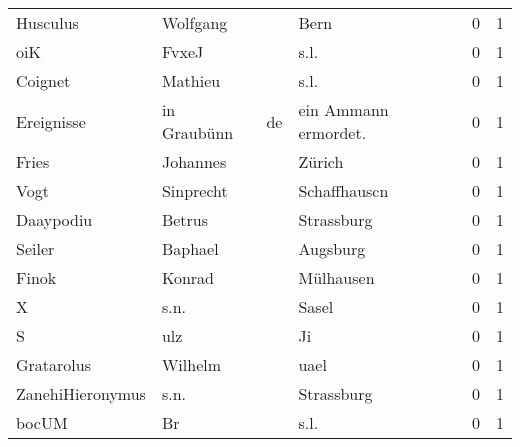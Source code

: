 \begin{tabular}{llllrr}
                 Husculus &                           Wolfgang &             &                                        Bern &          0 &         1 \\
                      oiK &                              FvxeJ &             &                                        s.l. &          0 &         1 \\
                  Coignet &                            Mathieu &             &                                        s.l. &          0 &         1 \\
               Ereignisse &                        in Graubünn &          de &                       ein Ammann ermordet.  &          0 &         1 \\
                    Fries &                           Johannes &             &                                      Zürich &          0 &         1 \\
                     Vogt &                          Sinprecht &             &                                Schaffhauscn &          0 &         1 \\
                Daaypodiu &                             Betrus &             &                                  Strassburg &          0 &         1 \\
                   Seiler &                            Baphael &             &                                    Augsburg &          0 &         1 \\
                    Finok &                             Konrad &             &                                   Mülhausen &          0 &         1 \\
                        X &                               s.n. &             &                                       Sasel &          0 &         1 \\
                        S &                                ulz &             &                                          Ji &          0 &         1 \\
               Gratarolus &                            Wilhelm &             &                                        uael &          0 &         1 \\
         ZanehiHieronymus &                               s.n. &             &                                  Strassburg &          0 &         1 \\
                    bocUM &                                 Br &             &                                        s.l. &          0 &         1 \\

\end{tabular}
